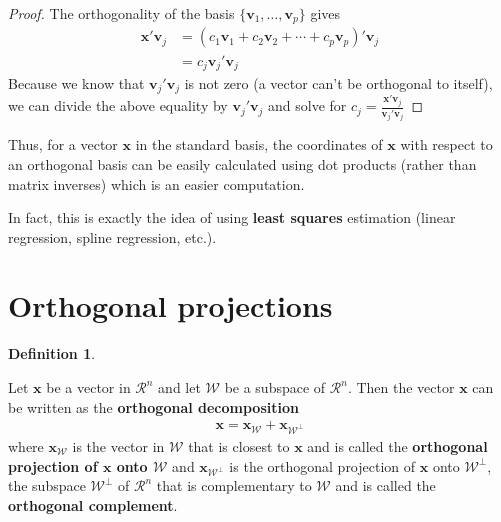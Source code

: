 \documentclass[
]{book}
\theoremstyle{definition}
\newtheorem{definition}{Definition}[chapter]
\theoremstyle{definition}
\theoremstyle{definition}
\theoremstyle{remark}
\begin{document}
\begin{proof}

The orthogonality of the basis \(\{ \mathbf{v}_1, \ldots, \mathbf{v}_p \}\) gives
\[
\begin{aligned}
\mathbf{x}'\mathbf{v}_j & = \left(c_1 \mathbf{v}_1 + c_2 \mathbf{v}_2 + \cdots + c_p \mathbf{v}_p \right)' \mathbf{v}_j \\
& = c_j \mathbf{v}_j' \mathbf{v}_j
\end{aligned}
\]
Because we know that \(\mathbf{v}_j'\mathbf{v}_j\) is not zero (a vector can't be orthogonal to itself), we can divide the above equality by \(\mathbf{v}_j' \mathbf{v}_j\) and solve for \(c_j = \frac{\mathbf{x}'\mathbf{v}_j}{\mathbf{v}_j'\mathbf{v}_j}\)

\end{proof}

Thus, for a vector \(\mathbf{x}\) in the standard basis, the coordinates of \(\mathbf{x}\) with respect to an orthogonal basis can be easily calculated using dot products (rather than matrix inverses) which is an easier computation.

In fact, this is exactly the idea of using \textbf{least squares} estimation (linear regression, spline regression, etc.).

\hypertarget{orthogonal-projections}{%
\section{Orthogonal projections}\label{orthogonal-projections}}

\begin{definition}
\protect\hypertarget{def:unlabeled-div-198}{}\label{def:unlabeled-div-198}

Let \(\mathbf{x}\) be a vector in \(\mathcal{R}^n\) and let \(\mathcal{W}\) be a subspace of \(\mathcal{R}^n\). Then the vector \(\mathbf{x}\) can be written as the \textbf{orthogonal decomposition}
\[
\begin{aligned}
\mathbf{x} = \mathbf{x}_{\mathcal{W}} + \mathbf{x}_{\mathcal{W}^\perp}
\end{aligned}
\]
where \(\mathbf{x}_{\mathcal{W}}\) is the vector in \(\mathcal{W}\) that is closest to \(\mathbf{x}\) and is called the \textbf{orthogonal projection of \(\mathbf{x}\) onto \(\mathcal{W}\)} and \(\mathbf{x}_{\mathcal{W}^\perp}\) is the orthogonal projection of \(\mathbf{x}\) onto \(\mathcal{W}^{\perp}\), the subspace \(\mathcal{W}^\perp\) of \(\mathcal{R}^n\) that is complementary to \(\mathcal{W}\) and is called the \textbf{orthogonal complement}.

\end{definition}
\end{document}
